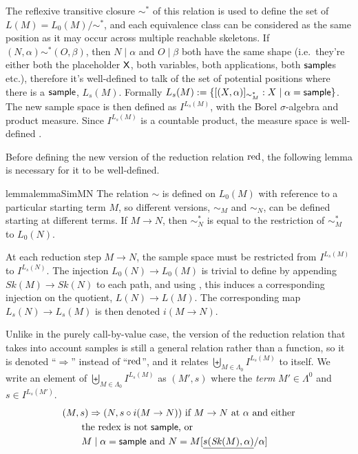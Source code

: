 The reflexive transitive closure $\sim^*$ of this relation is used to define the set of  $L(M) = L_0(M) / \sim^*$, and each equivalence class can be considered as the same position as it may occur across multiple reachable skeletons. 
If $(N,\alpha) \sim^* (O,\beta)$, then $N \mid \alpha$ and $O \mid \beta$ both have the same shape (i.e.~they're either both the placeholder $\mathsf{X}$, both variables, both applications, both $\mathsf{sample}$s etc.), therefore it's well-defined to talk of the set of potential positions where there is a $\mathsf{sample}$, $L_s(M)$. 
Formally $L_s(M) := \{[(X, \alpha)]_{\sim^\ast_M} : X \mid \alpha = \mathsf{sample}\}$.
The new sample space is then defined as $I^{L_s(M)}$, with the Borel $\sigma$-algebra and product measure.
Since $I^{L_s(M)}$ is a countable product, the measure space is well-defined \cite[Cor.~2.7.3]{AshDD00}.

\medskip
Before defining the new version of the reduction relation $\operatorname{red}$, the following lemma is necessary for it to be well-defined.

\begin{restatable}{lemma}{lemmaSimMN}
\label{lem:sim-M-N}
The relation $\sim$ is defined on $L_0(M)$ with reference to a particular starting term $M$, so different versions, $\sim_M$ and $\sim_N$, can be defined starting at different terms. If $M \to N$, then $\sim^*_N$ is equal to the restriction of $\sim^*_M$ to $L_0(N)$.
\end{restatable} 


At each reduction step $M \to N$, the sample space must be restricted from $I^{L_s(M)}$ to $I^{L_s(N)}$. 
The injection $L_0(N) \to L_0(M)$ is trivial to define by appending $\mathit{Sk}(M) \to \mathit{Sk}(N)$ to each path, and using , this induces a corresponding injection on the quotient, $L(N) \to L(M)$. 
The corresponding map $L_s(N) \to L_s(M)$ is then denoted $i(M \to N)$.

\begin{definition}
Unlike in the purely call-by-value case, the version of the reduction relation that takes into account samples is still a general relation rather than a function, so it is denoted ``$\Rightarrow$'' instead of ``$\operatorname{red}$'', and it relates $\biguplus_{M \in \Lambda_0} I^{L_s(M)}$ to itself.
We write an element of $\biguplus_{M \in \Lambda_0} I^{L_s(M)}$ as $(M', s)$ where the \emph{term} $M' \in \Lambda^0$ and $s \in  I^{L_s(M')}$.
\begin{align*}
& (M,s) \Rightarrow (N,s \circ i(M \to N)) \text{ if $M \to N$ at $\alpha$ and either} \\
& \qquad \text{the redex is not $\mathsf{sample}$, or} \\
& \qquad \text{$M \mid \alpha = \mathsf{sample}$ and $N = M[\underline{s(\mathit{Sk}(M),\alpha)}/\alpha]$}
\end{align*}
\end{definition}

